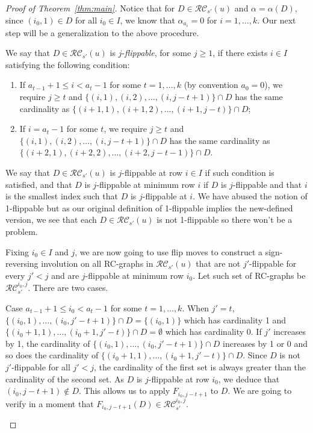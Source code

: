 \documentclass[10pt]{amsart}
\newcommand{\RC}{\mathcal{RC}}
\begin{document}
\begin{proof}[Proof of Theorem~\ref{thm:main}]
Notice that for $D\in\RC_{s'}(u)$ and $\alpha=\alpha(D)$, since $(i_0,1)\in D$ for all $i_0\in I$, we know that $\alpha_{a_i}=0$ for $i=1,\ldots,k$. Our next step will be a generalization to the above procedure.

We say that $D\in\RC_{s'}(u)$ is $j$-\emph{flippable}, for some $j\geq1$, if there exists $i\in I$ satisfying the following condition:
\begin{enumerate}
\item\label{proof_theo2.2_deux1} If $a_{t-1}+1\leq i<a_t-1$ for some $t=1,\ldots,k$ (by convention $a_{0}=0$), we require $j\geq t$ and $\{(i,1),(i,2),\ldots,(i,j-t+1)\}\cap D$ has the same cardinality as $\{(i+1,1),(i+1,2),\ldots,(i+1,j-t)\}\cap D$;
\item\label{proof_theo2.2_deux2} If $i=a_t-1$ for some $t$, we require $j\geq t$ and $\{(i,1),(i,2),\ldots,(i,j-t+1)\}\cap D$ has the same cardinality as $\{(i+2,1),(i+2,2),\ldots,(i+2,j-t-1)\}\cap D$.
\end{enumerate}
We say that $D\in\RC_{s'}(u)$ is $j$-flippable at row $i\in I$ if such condition is satisfied, and that $D$ is $j$-flippable at minimum row $i$ if $D$ is $j$-flippable and that $i$ is the smallest index such that $D$ is $j$-flippable at $i$. We have abused the notion of 1-flippable but as our original definition of 1-flippable implies the new-defined version, we see that each $D\in\RC_{s'}(u)$ is not 1-flippable so there won't be a problem.

Fixing $i_0\in I$ and $j$, we are now going to use flip moves to construct a sign-reversing involution on all RC-graphs in $\RC_{s'}(u)$ that are not $j'$-flippable for every $j'<j$ and are $j$-flippable at minimum row $i_0$. Let such set of RC-graphs be $\RC_{s'}^{i_0,j}$. There are two cases.


\let\oldthecdrthm\thecdrthm
\renewcommand{\thecdrthm}{(\arabic{cdrthm})}
\setcounter{cdrthm}{0}
\begin{enonce}[remark]{Case}\label{case1}
 $a_{t-1}+1\leq i_0<a_t-1$ for some $t=1,\ldots,k$. When $j'=t$, $\{(i_0,1),\ldots,(i_0,j'-t+1)\}\cap D=\{(i_0,1)\}$ which has cardinality 1 and $\{(i_0+1,1),\ldots,(i_0+1,j'-t)\}\cap D=\emptyset$ which has cardinality 0. If $j'$ increases by 1, the cardinality of $\{(i_0,1),\ldots,(i_0,j'-t+1)\}\cap D$ increases by 1 or 0 and so does the cardinality of $\{(i_0+1,1),\ldots,(i_0+1,j'-t)\}\cap D$. Since $D$ is not $j'$-flippable for all $j'<j$, the cardinality of the first set is always greater than the cardinality of the second set. As $D$ is $j$-flippable at row $i_0$, we deduce that $(i_0,j-t+1)\notin D$. This allows us to apply $F_{i_0,j-t+1}$ to $D$. We are going to verify in a moment that $F_{i_0,j-t+1}(D)\in\RC_{s'}^{i_0,j}$.
\end{enonce}


\end{proof}
\end{document}
